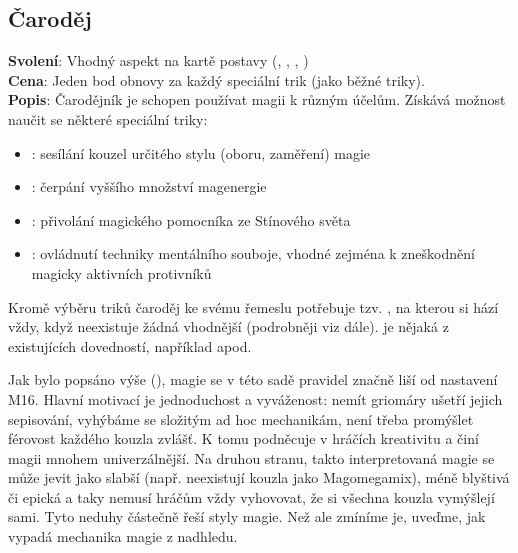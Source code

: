 \documentclass[../main.tex]{subfiles}
\begin{document}
\begin{povolani}
\subsection{Čaroděj}
\label{sec:pov-carodej}
\textbf{Svolení}: Vhodný aspekt na kartě postavy (, , , )\\
\textbf{Cena}: Jeden bod obnovy za každý speciální trik (jako běžné triky). \\
\textbf{Popis}: Čarodějník je schopen používat magii k různým účelům. Získává možnost naučit se některé speciální triky:
\begin{itemize}
\item {}: sesílání kouzel určitého stylu (oboru, zaměření) magie
\item {}: čerpání vyššího množství magenergie
\item {}: přivolání magického pomocníka ze Stínového světa
\item {}: ovládnutí techniky mentálního souboje, vhodné zejména k zneškodnění magicky aktivních protivníků
\end{itemize}
Kromě výběru triků čaroděj ke svému řemeslu potřebuje tzv. , na kterou si hází vždy, když neexistuje žádná vhodnější (podrobněji viz dále).  je nějaká z existujících dovedností, například  apod. 
\end{povolani}
Jak bylo popsáno výše (), magie se v této sadě pravidel značně liší od nastavení M16. Hlavní motivací je jednoduchost a vyváženost: nemít griomáry ušetří jejich sepisování, vyhýbáme se složitým ad hoc mechanikám, není třeba promýšlet férovost každého kouzla zvlášť. K tomu podněcuje v hráčích kreativitu a činí magii mnohem univerzálnější. Na druhou stranu, takto interpretovaná magie se může jevit jako slabší (např. neexistují kouzla jako Magomegamix), méně blyštivá či epická a taky nemusí hráčům vždy vyhovovat, že si všechna kouzla vymýšlejí sami. Tyto neduhy částečně řeší styly magie. Než ale zmíníme je, uveďme, jak vypadá mechanika magie z nadhledu.
\end{document}
